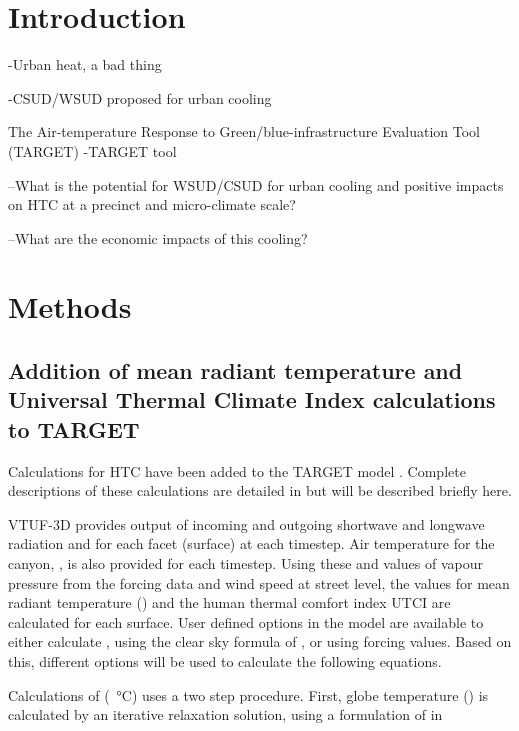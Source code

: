 \documentclass[final,3p,times,authoryear]{elsarticle}
\begin{document}
\section{Introduction}\label{sec:introduction}

-Urban heat, a bad thing

-CSUD/WSUD proposed for urban cooling

The Air-temperature Response to Green/blue-infrastructure Evaluation Tool (TARGET)
-TARGET tool
\citep{Broadbent2018}

--What is the potential for WSUD/CSUD for urban cooling and positive impacts on HTC at a precinct and micro-climate scale?

--What are the economic impacts of this cooling?



\section{Methods}\label{sec:Methods}



\subsection{Addition of mean radiant temperature and Universal Thermal Climate Index calculations to TARGET}\label{sec:tmrtutci}

Calculations for HTC have been added to the TARGET model \citep{Broadbent2018}. Complete descriptions of these calculations are detailed in \cite{Nice2018} but will be described briefly here.


VTUF-3D provides output of incoming and outgoing shortwave and longwave radiation and  for each facet (surface) at each timestep. Air temperature for the canyon, , is also provided for each timestep. Using these and values of vapour pressure from the forcing data and wind speed at street level, the values for mean radiant temperature () and the human thermal comfort index UTCI are calculated for each surface. User defined options in the model are available to either calculate , using the clear sky formula of \cite{Prata1996}, or using forcing values. Based on this, different options will be used to calculate the following equations.

Calculations of  (\SI{}{\degreeCelsius}) uses a two step procedure. First, globe temperature () is calculated by an iterative relaxation solution, using a formulation of \cite{Liljegren2008} in  
\end{document}
